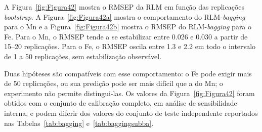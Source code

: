 A Figura~\ref{fig:Figura42} mostra o RMSEP da RLM em função das replicações
\textit{bootstrap}. A Figura~\ref{fig:Figura42a} mostra o comportamento do
RLM-\textit{bagging} para o Mn e a Figura~\ref{fig:Figura42b} mostra o RMSEP do
RLM-\textit{bagging} para o Fe. Para o Mn, o RMSEP tende a se estabilizar entre
\num{0,026} e \num{0,030} a partir de 15--20 replicações. Para o Fe, o RMSEP
oscila entre \num{1,3} e \num{2,2} em todo o intervalo de 1 a 50 replicações,
sem estabilização observável.

Duas hipóteses são compatíveis com esse comportamento: o Fe pode exigir mais
de 50 replicações, ou sua predição pode ser mais difícil que a do Mn; o
experimento não permite distingui-las. Os valores da
Figura~\ref{fig:Figura42} foram obtidos com o conjunto de calibração completo,
em análise de sensibilidade interna, e podem diferir dos valores do conjunto de
teste independente reportados nas Tabelas~\ref{tab:bagging}
e~\ref{tab:baggingsubba}.

